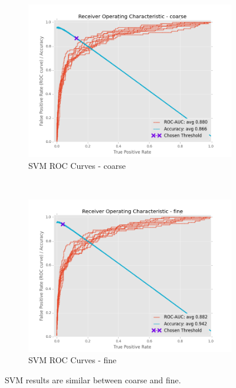 \documentclass[ms]{nuthesis}
\begin{document}
\FloatBarrier
\begin{figure}[!htb]
    \centering
    \begin{subfigure}[t]{0.5\textwidth}
        \centering
        \includegraphics[width=\textwidth]{fig/SVM_FindThreshold_RocCurve_coarse}
        \caption{SVM ROC Curves - coarse}
    \end{subfigure}%
    ~
    \begin{subfigure}[t]{0.5\textwidth}
        \centering
        \includegraphics[width=\textwidth]{fig/SVM_FindThreshold_RocCurve_fine}
        \caption{SVM ROC Curves - fine}
    \end{subfigure}
    \caption{SVM results are similar between coarse and fine.}
    \label{fig:SVMThreshRoc}
\end{figure}
\FloatBarrier
\end{document}
